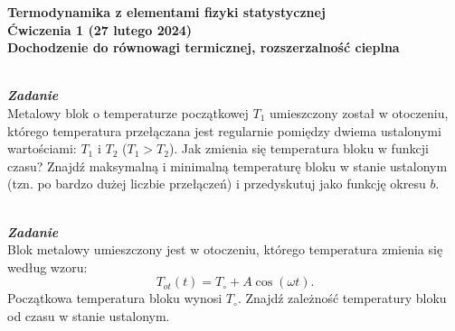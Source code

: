 \documentclass[11pt,a4paper]{article}
\newcounter{zadanie}\newcommand{\zadanie}[1][]{\addtocounter{zadanie}{1} ~\\  {\bf \emph{Zadanie \arabic{zadanie} #1 }} \\}
\begin{document}

\begin{centering}
\bf{\Large{Termodynamika z elementami fizyki statystycznej}}\\
Ćwiczenia 1 (27 lutego 2024)\\[5mm]
Dochodzenie do równowagi termicznej, rozszerzalność cieplna \\
\end{centering}
\vspace{0mm}

\zadanie
Metalowy blok o temperaturze początkowej $T_1$ umieszczony został
w otoczeniu, którego temperatura przełączana jest regularnie
pomiędzy dwiema ustalonymi wartościami: $T_1$ i $T_2$ ($T_1>T_2$).
Jak zmienia się temperatura bloku w funkcji czasu?
Znajdź maksymalną i minimalną temperaturę bloku
w stanie ustalonym (tzn. po bardzo dużej liczbie przełączeń)
i przedyskutuj jako funkcję okresu $b$.
\begin{center}
\end{center}\vspace{-5mm}
\vskip 2pt

\zadanie
Blok metalowy umieszczony jest w otoczeniu, którego temperatura
zmienia się według wzoru:
\[T_{ot}(t) = T_\circ + A \cos(\omega t).\]
Początkowa temperatura bloku wynosi $T_\circ$. Znajdź zależność
temperatury bloku od czasu w stanie ustalonym.
\vskip 2pt

\end{document}
